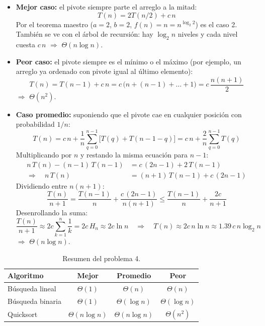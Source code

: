 \documentclass[11pt]{article}
\newcommand{\res}[1]{\textcolor{azul}{\textbf{#1}}}
\begin{document}
\begin{itemize}
  \item \textbf{Mejor caso:} el pivote siempre parte el arreglo a la mitad:
        \[
          T(n) = 2T(n/2) + c\,n
        \]
        Por el teorema maestro ($a = 2$, $b = 2$, $f(n) = n = n^{\log_2 2}$) es el caso 2.
        También se ve con el árbol de recursión: hay $\log_2 n$ niveles y cada nivel cuesta
        $c\,n$ $\Rightarrow$ \res{$\Theta(n\log n)$}.
  \item \textbf{Peor caso:} el pivote siempre es el mínimo o el máximo (por ejemplo, un arreglo
        ya ordenado con pivote igual al último elemento):
        \[
          T(n) = T(n-1) + c\,n = c\,\bigl(n + (n-1) + \dots + 1\bigr) = c\,\frac{n(n+1)}{2}
        \]
        $\Rightarrow$ \res{$\Theta(n^2)$}.
  \item \textbf{Caso promedio:} suponiendo que el pivote cae en cualquier posición con
        probabilidad $1/n$:
        \[
          T(n) = c\,n + \frac{1}{n}\sum_{q=0}^{n-1}\bigl[T(q) + T(n-1-q)\bigr]
               = c\,n + \frac{2}{n}\sum_{q=0}^{n-1} T(q)
        \]
        Multiplicando por $n$ y restando la misma ecuación para $n-1$:
        \begin{align*}
          n\,T(n) - (n-1)\,T(n-1) &= c\,(2n-1) + 2\,T(n-1) \\
          \Rightarrow\quad n\,T(n) &= (n+1)\,T(n-1) + c\,(2n-1)
        \end{align*}
        Dividiendo entre $n(n+1)$:
        \[
          \frac{T(n)}{n+1} = \frac{T(n-1)}{n} + \frac{c\,(2n-1)}{n(n+1)}
                           \le \frac{T(n-1)}{n} + \frac{2c}{n+1}
        \]
        Desenrollando la suma:
        \[
          \frac{T(n)}{n+1} \approx 2c\sum_{k=1}^{n}\frac{1}{k} = 2c\,H_n \approx 2c\ln n
          \quad\Rightarrow\quad T(n) \approx 2c\,n\ln n \approx 1.39\,c\,n\log_2 n
        \]
        $\Rightarrow$ \res{$\Theta(n\log n)$}.
\end{itemize}

\begin{table}[h]
\centering
\begin{tabular}{lccc}
  \toprule
  Algoritmo & Mejor & Promedio & Peor \\
  \midrule
  Búsqueda lineal  & $\Theta(1)$        & $\Theta(n)$        & $\Theta(n)$ \\
  Búsqueda binaria & $\Theta(1)$        & $\Theta(\log n)$   & $\Theta(\log n)$ \\
  Quicksort        & $\Theta(n\log n)$  & $\Theta(n\log n)$  & $\Theta(n^2)$ \\
  \bottomrule
\end{tabular}
\caption{Resumen del problema 4.}
\end{table}
\end{document}

